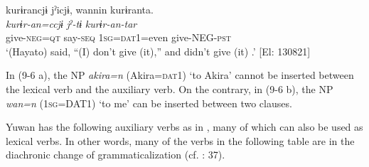   \ex\label{ex:9.6b}

 \glll  kurɨrancjɨ  jˀicjɨ,  wannin  kurɨranta.\\
    \textit{kurɨr-an=ccjɨ}  \textit{jˀ-tɨ}  \textit{}  \textit{kurɨr-an-tar}\\
    give-\textsc{neg}=\textsc{qt}  say-\textsc{seq}  1\textsc{sg}=\textsc{dat}1=even  give-NEG-\textsc{pst}\\
    \glt     ‘(Hayato) said, “(I) don’t give (it),” and didn’t give (it) .’ [El: 130821]
    \z
\z

In (9-6 a), the NP \textit{akira=n} (Akira=\textsc{dat}1) ‘to Akira’ cannot be inserted between the lexical verb and the auxiliary verb. On the contrary, in (9-6 b), the NP \textit{wan=n} (1\textsc{sg}=DAT1) ‘to me’ can be inserted between two clauses.

Yuwan has the following auxiliary verbs as in , many of which can also be used as lexical verbs. In other words, many of the verbs in the following table are in the diachronic change of grammaticalization (cf. \citealt{Lehmann1995}: 37).

